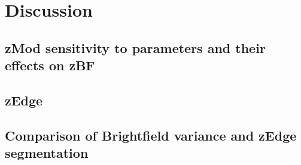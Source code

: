 
\chapter{Discussion}

\ifpdf
    \graphicspath{{Chapter6/Figs/Raster/}{Chapter6/Figs/PDF/}{Chapter6/Figs/}}
\else
    \graphicspath{{Chapter6/Figs/Vector/}{Chapter6/Figs/}}
\fi

\section[zMod sensitivity results]{zMod sensitivity to parameters and their effects on zBF}


\section{zEdge}


\section[Previous method comparison]{Comparison of Brightfield variance and zEdge segmentation}
